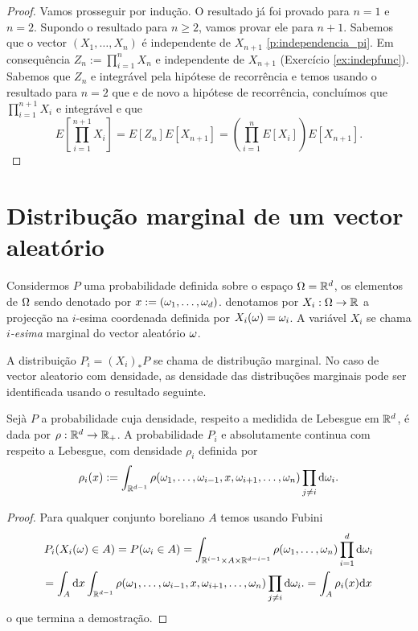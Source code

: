   \begin{proof}
   Vamos prosseguir por indução. O resultado já foi provado para $n=1$ e $n=2$.
Supondo o resultado para $n\ge 2$, vamos provar ele para $n+1$.
Sabemos que o vector $(X_1,\dots,X_n)$ é independente de $X_{n+1}$ \cref{p:independencia_pi}. Em consequência $Z_n:=\prod_{i=1}^n X_n$
e independente de $X_{n+1}$ (Exercício \ref{ex:indepfunc}). Sabemos que $Z_n$ e integrável pela hipótese de recorrência e temos
usando o resultado para $n=2$ que e de novo a hipótese de recorrência, concluímos que $\prod_{i=1}^{n+1} X_i$ e integrável e que
\begin{equation}
 E[\prod_{i=1}^{n+1} X_i]=E[Z_n]E[X_{n+1}]=\left(\prod_{i=1}^n E[X_i]\right) E[X_{n+1}].
\end{equation}


\end{proof}

\section{Distribução marginal de um vector aleatório}

Considermos $P$ uma probabilidade definida sobre o espaço $\Omega={\mathbb R}^d$, os elementos de $\Omega$ sendo denotado por $x:=(\omega_1,\dots,\omega_d)$.
denotamos por $X_i : \Omega \to {\ensuremath{\mathbb R}}$ a projecção na $i$-esima coordenada definida por $X_i(\omega)=\omega_i$.
A variável $X_i$ se chama \emph{$i$-esima} marginal do vector aleatório $\omega$. 

\medskip

A distribuição $P_i=(X_i)_*P$ se chama de distribução marginal.
No caso de vector aleatorio com densidade, as densidade das distribuções marginais pode ser identificada usando o resultado seguinte.

\begin{proposition}
 Sejà $P$ a probabilidade cuja densidade, respeito a medidida de Lebesgue em ${\mathbb R}^d$, é dada por $\rho: {\mathbb R}^d \to {\ensuremath{\mathbb R}}_+$.
 A probabilidade $P_i$ e absolutamente continua com respeito a Lebesgue, com densidade $\rho_i$ definida por
 \begin{equation*}
  \rho_i(x):= \int_{{\mathbb R}^{d-1}}\rho(\omega_1,\dots ,\omega_{i-1},x,\omega_{i+1},\dots,\omega_n)\prod_{j\ne i} \mathrm{d} \omega_i.
 \end{equation*}



\end{proposition}

\begin{proof}
 Para qualquer conjunto boreliano $A$ temos usando Fubini
 \begin{multline*}
  P_i(X_i(\omega)\in A)=P(\omega_i\in A)= \int_{{\mathbb R}^{i-1}\times A \times {\ensuremath{\mathbb R}}^{d-i-1}}
  \rho(\omega_1,\dots,\omega_n)\prod_{i=1}^d \mathrm{d} \omega_i
  \\ =\int_A  \mathrm{d} x \int_{{\mathbb R}^{d-1}}\rho(\omega_1,\dots ,\omega_{i-1},x,\omega_{i+1},\dots,\omega_n)\prod_{j\ne i} \mathrm{d} \omega_i.
  =\int_A\rho_i(x)\mathrm{d} x
 \end{multline*}
o que termina a demostração.
\end{proof}


